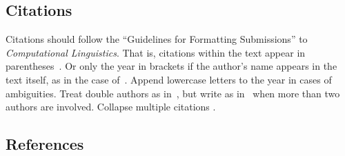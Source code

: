\documentclass[10pt, a4paper]{article}
\begin{document}
\subsection{Citations}
\label{subsec:citations}

Citations should follow the \enquote{Guidelines for Formatting Submissions} to \emph{Computational Linguistics}.
That is, citations within the text appear in parentheses~\citep{gusfield1997algorithms}.
Or only the year in brackets if the author's name appears in the text itself, as in the case of~\citet{gusfield1997algorithms}.
Append lowercase letters to the year in cases of ambiguities.
Treat double authors as in~\citet{aho1972theory}, but write as in~\citet{chandra1981embedded} when more than two authors are involved.
Collapse multiple citations \citep{wagner1974string, chandra1981embedded}.

\subsection{References}
\label{subsec:references}
\end{document}
